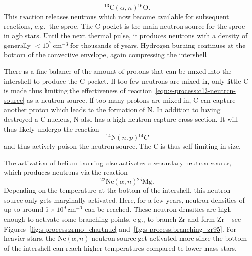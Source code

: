 \begin{equation}
    ^{13}\mathrm{C}(\alpha, n){^{16}}\mathrm{O}. \label{eqn:s-process:c13-neutron-source}
\end{equation}
This reaction releases neutrons which now become available for subsequent reactions, e.g., the \ac{sproc}. The C-pocket is the main neutron source for the \ac{sproc} in \ac{agb} stars. Until the next thermal pulse, it produces neutrons with a density of generally $<10^{7}$\,cm$^{-3}$ for thousands of years. Hydrogen burning continues at the bottom of the convective envelope, again compressing the intershell.

There is a fine balance of the amount of protons that can be mixed into the intershell to produce the C-pocket. If too few neutrons are mixed in, only little C is made thus limiting the effectiveness of reaction~\eqref{eqn:s-process:c13-neutron-source} as a neutron source. If too many protons are mixed in, C can capture another proton which leads to the formation of N. In addition to having destroyed a C nucleus, N also has a high neutron-capture cross section. It will thus likely undergo the reaction
\begin{equation}
    ^{14}\mathrm{N}(n,p){^{14}}C
\end{equation}
and thus actively poison the neutron source. The C is thus self-limiting in size.

The activation of helium burning also activates a secondary neutron source, which produces neutrons via the reaction
\begin{equation}
    ^{22}\mathrm{Ne}(\alpha, n){^{25}}\mathrm{Mg}. \label{eqn:s-process:ne22-neutron-source}
\end{equation}
Depending on the temperature at the bottom of the intershell, this neutron source only gets marginally activated. Here, for a few years, neutron densities of up to around $5\times10^{9}$\,cm$^{-3}$ can be reached. These neutron densities are high enough to activate some branching points, e.g., to branch Zr and form Zr -- see Figures~\ref{fig:s-process:zrmo_chartnuc} and~\ref{fig:s-process:branching_zr95}. For heavier stars, the Ne$(\alpha, n)$ neutron source get activated more since the bottom of the intershell can reach higher temperatures compared to lower mass stars.

